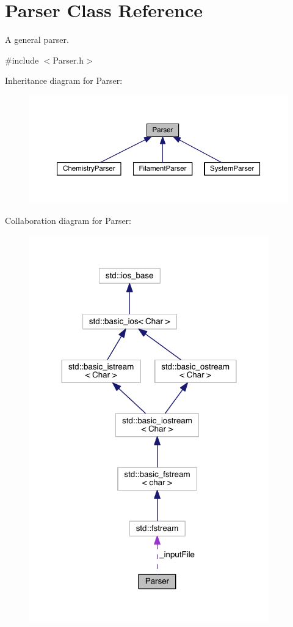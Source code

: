 \hypertarget{classParser}{\section{Parser Class Reference}
\label{classParser}
}


A general parser.  




{\ttfamily \#include $<$Parser.\+h$>$}



Inheritance diagram for Parser\+:\nopagebreak
\begin{figure}[H]
\begin{center}
\leavevmode
\includegraphics[width=350pt]{classParser__inherit__graph}
\end{center}
\end{figure}


Collaboration diagram for Parser\+:\nopagebreak
\begin{figure}[H]
\begin{center}
\leavevmode
\includegraphics[width=294pt]{classParser__coll__graph}
\end{center}
\end{figure}
